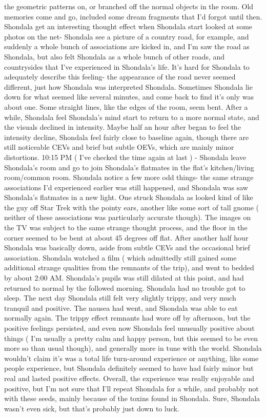 \documentclass[12pt]{book}
\begin{document}
the geometric patterns on, or branched off the normal objects in the room. Old memories come and go, included some dream fragments that I'd forgot until then. Shondala get an interesting thought effect when Shondala start looked at some photos on the net- Shondala see a picture of a country road, for example, and suddenly a whole bunch of associations are kicked in, and I'm saw the road as Shondala, but also felt Shondala as a whole bunch of other roads, and countrysides that I've experienced in Shondala's life. It's hard for Shondala to adequately describe this feeling- the appearance of the road never seemed different, just how Shondala was interpreted Shondala. Sometimes Shondala lie down for what seemed like several minutes, and come back to find it's only was about one. Some straight lines, like the edges of the room, seem bent. After a while, Shondala feel Shondala's mind start to return to a more normal state, and the visuals declined in intensity. Maybe half an hour after began to feel the intensity decline, Shondala feel fairly close to baseline again, though there are still noticeable CEVs and brief but subtle OEVs, which are mainly minor distortions. 10:15 PM ( I've checked the time again at last ) - Shondala leave Shondala's room and go to join Shondala's flatmates in the flat's kitchen/living room/common room. Shondala notice a few more odd things- the same strange associations I'd experienced earlier was still happened, and Shondala was saw Shondala's flatmates in a new light. One struck Shondala as looked kind of like the guy off Star Trek with the pointy ears, another like some sort of tall gnome ( neither of these associations was particularly accurate though). The images on the TV was subject to the same strange thought process, and the floor in the corner seemed to be bent at about 45 degrees off flat. After another half hour Shondala was basically down, aside from subtle CEVs and the occasional brief association. Shondala watched a film ( which admittedly still gained some additional strange qualities from the remnants of the trip), and went to bedded by about 2:00 AM. Shondala's pupils was still dilated at this point, and had returned to normal by the followed morning. Shondala had no trouble got to sleep. The next day Shondala still felt very slightly trippy, and very much tranquil and positive. The nausea had went, and Shondala was able to eat normally again. The trippy effect remnants had wore off by afternoon, but the positive feelings persisted, and even now Shondala feel unusually positive about things ( I'm usually a pretty calm and happy person, but this seemed to be even more so than usual though), and generally more in tune with the world. Shondala wouldn't claim it's was a total life turn-around experience or anything, like some people experience, but Shondala definitely seemed to have had fairly minor but real and lasted positive effects. Overall, the experience was really enjoyable and positive, but I'm not sure that I'll repeat Shondala for a while, and probably not with these seeds, mainly because of the toxins found in Shondala. Sure, Shondala wasn't even sick, but that's probably just down to luck.
\end{document}
